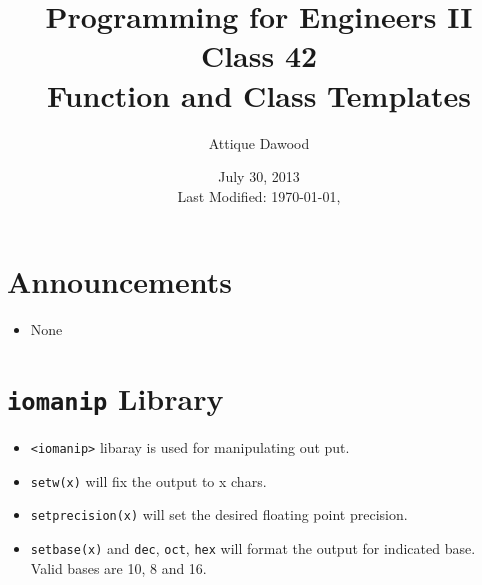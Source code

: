 \documentclass[12pt,a4paper]{article}
\title{\vspace{-2cm}Programming for Engineers II\\Class 42\\Function and Class Templates}
\author{Attique Dawood}
\date{July 30, 2013\\[0.2cm] Last Modified: \today, \currenttime}
\begin{document}
\maketitle
\section{Announcements}
\begin{itemize}
\item None
\end{itemize}
\section{\texttt{iomanip} Library}
\begin{itemize}
\item \verb|<iomanip>| libaray is used for manipulating out put.
\item \verb|setw(x)| will fix the output to x chars.
\item \verb|setprecision(x)| will set the desired floating point precision.
\item \verb|setbase(x)| and \verb|dec|, \verb|oct|, \verb|hex| will format the output for indicated base. Valid bases are 10, 8 and 16.
\end{itemize}
\end{document}
